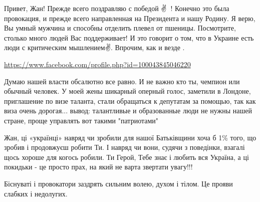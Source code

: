 \begin{itemize}

Привет, Жан! Прежде всего поздравляю с победой ✌️💪🙌! Конечно это была
провокация, и прежде всего направленная на Президента и нашу Родину. Я верю, Вы
умный мужчина и способны отделить плевел от пшеницы. Посмотрите, столько много
людей Вас поддерживает! И это говорит о том, что в Украине есть люди с
критическим мышлением✌️. Впрочим, как и везде .


\url{https://www.facebook.com/profile.php?id=100043845046220}\par
 

Думаю нашей власти обсалютно все равно. И не важно кто ты, чемпион или обычный
человек. У моей жены шикарный оперный голос, заметили в Лондоне, приглашение по
визе таланта, стали обращаться к депутатам за помощью, так как виза очень
дорогая... вывод: талантливые и образованные люди не нужны нашей стране, проще
управлять вот такими "патриотами"

 

Жан, ці «українці» навряд чи зробили для нашої Батьківщини хоча б 1\% того, що
зробив і продовжуєш робити Ти. І навряд чи вони, судячи з поведінки, взагалі
щось хороше для когось робили. Ти Герой, Тебе знає і любить вся Україна, а ці
покидьки - це просто прах, на який не варта звертати увагу!!!


Біснуваті і провокатори заздрять сильним волею, духом і тілом. Це прояви слабких
і недолугих.

\begin{itemize}
 

\end{itemize}
\end{itemize}
